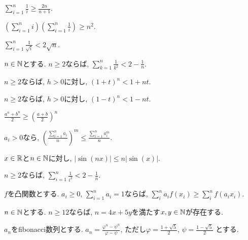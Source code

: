\begin{prop}
$\sum_{i=1}^{n}\frac{1}{i}\geq \frac{2n}{n+1}$.
\end{prop}

\begin{prop}
$\left(\sum_{i=1}^{n}i\right)\left(\sum_{i=1}^{n}\frac{1}{i}\right)\geq n^2$.
\end{prop}

\begin{prop}
$\sum_{i=1}^{n}\frac{1}{\sqrt{i}}<2\sqrt{n}$.
\end{prop}

\begin{prop}
$n\in\mathbb{N}$とする.
  $n\geq 2$ならば, $\sum_{k=1}^n\frac{1}{k^2} < 2-\frac{1}{n}$.
\end{prop}

\begin{prop}
  $n\geq 2$ならば,  $h>0$に対し,
$(1+t)^n<1+nt$.
\end{prop}
\begin{prop}
  $n\geq 2$ならば,  $h>0$に対し,
$(1-t)^n<1-nt$.
\end{prop}

\begin{prop}
$\frac{a^n+b^n}{2}\geq \left(\frac{a+b}{2}\right)^n$
\end{prop}

\begin{prop}
  $a_i>0$なら,
  $\left(\frac{\sum_{i=1}^n a_i}{n}\right)^m \leq \frac{\sum_{i=1}^{n}a_i^m}{n}$.
\end{prop}

\begin{prop}
$x\in\mathbb{R}$と$n\in\mathbb{N}$に対し, $|\sin(nx)|\leq n|\sin(x)|$.
\end{prop}

\begin{prop}
  $n\geq 2$ならば,
  $\sum_{i=1}^{n}\frac{1}{i^2}<2-\frac{1}{n}$.
\end{prop}

\begin{prop}
  $f$を凸関数とする.
  $a_i\geq 0$, $\sum_{i=1}^n a_i=1$ならば,
  $\sum_{i}^{n} a_i f(x_i)\geq \sum_{i}^{n}  f(a_i x_i)$.
\end{prop}




\begin{prop}
$n\in\mathbb{N}$とする.
  $n\geq 12$ならば, $n=4x+5y$を満たす$x,y\in\mathbb{N}$が存在する.
\end{prop}


\begin{prop}
  $a_n$をfibonacci数列とする.
  $a_n=\frac{\varphi^n-\psi^n}{\varphi-\psi}$,
  ただし$\varphi=\frac{1+\sqrt{5}}{2}$,
  $\psi=\frac{1-\sqrt{5}}{2}$
  とする.
\end{prop}

